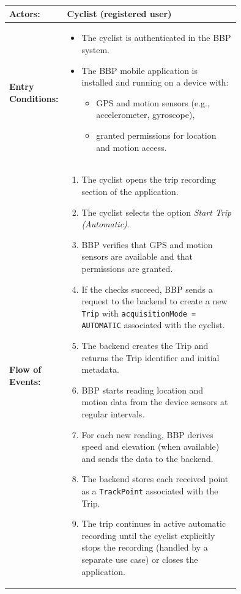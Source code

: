 \begin{center}
\begin{longtable}{|l|p{0.75\linewidth}|}
    \hline
    \textbf{Actors:}           
    & Cyclist (registered user)                                                                  \\
    \hline

    \textbf{Entry Conditions:} 
    & \begin{itemize}
          \item The cyclist is authenticated in the BBP system.
          \item The BBP mobile application is installed and running on a device with:
                \begin{itemize}
                    \item GPS and motion sensors (e.g., accelerometer, gyroscope),
                    \item granted permissions for location and motion access.
                \end{itemize}
       \end{itemize}                                                                              \\
    \hline

    \textbf{Flow of Events:}   
    & \begin{enumerate}
          \item The cyclist opens the trip recording section of the application.
          \item The cyclist selects the option \emph{Start Trip (Automatic)}.
          \item BBP verifies that GPS and motion sensors are available and that permissions are granted.
          \item If the checks succeed, BBP sends a request to the backend to create a new \texttt{Trip} with \texttt{acquisitionMode = AUTOMATIC} associated with the cyclist.
          \item The backend creates the Trip and returns the Trip identifier and initial metadata.
          \item BBP starts reading location and motion data from the device sensors at regular intervals.
          \item For each new reading, BBP derives speed and elevation (when available) and sends the data to the backend.
          \item The backend stores each received point as a \texttt{TrackPoint} associated with the Trip.
          \item The trip continues in active automatic recording until the cyclist explicitly stops the recording (handled by a separate use case) or closes the application.
       \end{enumerate}                                                                          \\
    \hline


\end{longtable}
\end{center}
